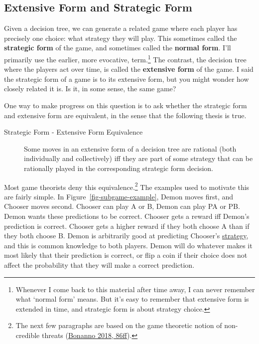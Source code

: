\documentclass[
  12pt,
  letterpaper,
  DIV=11,
  numbers=noendperiod]{scrreprt}
\begin{document}
\hypertarget{sec-equivalence-intro}{%
\subsection{Extensive Form and Strategic
Form}\label{sec-equivalence-intro}}

Given a decision tree, we can generate a related game where each player
has precisely one choice: what strategy they will play. This sometimes
called the \textbf{strategic form} of the game, and sometimes called the
\textbf{normal form}. I'll primarily use the earlier, more evocative,
term.\footnote{Whenever I come back to this material after time away, I
  can never remember what `normal form' means. But it's easy to remember
  that extensive form is extended in time, and strategic form is about
  strategy choice.} The contrast, the decision tree where the players
act over time, is called the \textbf{extensive form} of the game. I said
the strategic form of a game is to its extensive form, but you might
wonder how closely related it is. Is it, in some sense, the same game?

One way to make progress on this question is to ask whether the
strategic form and extensive form are equivalent, in the sense that the
following thesis is true.

\begin{description}
\item[Strategic Form - Extensive Form Equivalence]
Some moves in an extensive form of a decision tree are rational (both
individually and collectively) iff they are part of some strategy that
can be rationally played in the corresponding strategic form decision.
\end{description}

Most game theorists deny this equivalence.\footnote{The next few
  paragraphs are based on the game theoretic notion of non-credible
  threats (\protect\hyperlink{ref-Bonanno2018}{Bonanno 2018, 86ff}).}
The examples used to motivate this are fairly simple. In
Figure~\ref{fig-subgame-example}, Demon moves first, and Chooser moves
second. Chooser can play A or B, Demon can play PA or PB. Demon wants
these predictions to be correct. Chooser gets a reward iff Demon's
prediction is correct. Chooser gets a higher reward if they both choose
A than if they both choose B. Demon is arbitrarily good at predicting
Chooser's \protect\hyperlink{sec-strategies}{strategy}, and this is
common knowledge to both players. Demon will do whatever makes it most
likely that their prediction is correct, or flip a coin if their choice
does not affect the probability that they will make a correct
prediction.
\end{document}
